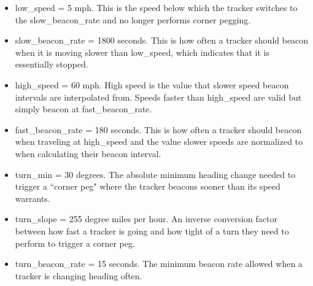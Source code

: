 \begin{itemize}
	\item low\_speed = 5 mph. This is the speed below which the tracker
		switches to the slow\_beacon\_rate and no longer performs corner pegging.
	\item slow\_beacon\_rate = 1800 seconds. This is how often a tracker
		should beacon when it is moving slower than low\_speed, which indicates
		that it is essentially stopped.
	\item high\_speed = 60 mph. High speed is the value that slower speed
		beacon intervals are interpolated from. Speeds faster than high\_speed
		are valid but simply beacon at fast\_beacon\_rate.
	\item fast\_beacon\_rate = 180 seconds. This is how often a tracker should
		beacon when traveling at high\_speed and the value slower speeds are 
		normalized to when calculating their beacon interval.
	\item turn\_min = 30 degrees. The absolute minimum heading change needed 
		to trigger
		a ``corner peg" where the tracker beacons sooner than its speed warrants.
	\item turn\_slope = 255 degree miles per hour. 
		An inverse conversion factor between how fast a tracker is going and 
		how tight of a turn they need to perform to trigger a corner peg.
	\item turn\_beacon\_rate = 15 seconds. The minimum beacon rate allowed 
		when a tracker is changing heading often.
	
\end{itemize}

